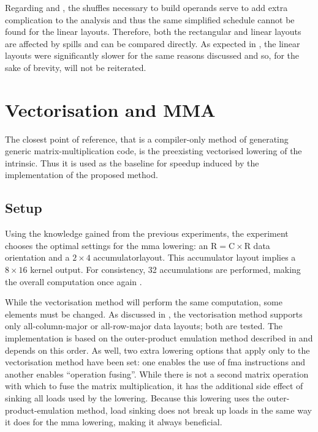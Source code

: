 \documentclass[\main/thesis.tex]{subfiles}
\begin{document}
Regarding  and , the shuffles necessary to build operands serve to add extra complication to the  analysis and thus the same simplified schedule cannot be found for the linear layouts.
Therefore, both the rectangular and linear layouts are affected by spills and can be compared directly.
As expected in , the linear layouts were significantly slower for the same reasons discussed and so, for the sake of brevity, will not be reiterated.

\section{Vectorisation and MMA}
The closest point of reference, that is a compiler-only method of generating generic matrix-multiplication code, is the preexisting vectorised lowering of the  intrinsic.
Thus it is used as the baseline for speedup induced by the implementation of the proposed method.

\subsection{Setup}
Using the knowledge gained from the previous experiments, the experiment chooses the optimal settings for the \gls{mma} lowering: an $\textrm{R} = \textrm{C} \times \textrm{R}$ data orientation and a $2 \times 4$ accumulator\footnotemark layout.
This accumulator layout implies a $8 \times 16$ kernel output.
For consistency, 32 accumulations are performed, making the overall computation once again .

While the vectorisation method will perform the same computation, some elements must be changed.
As discussed in , the vectorisation method supports only all-column-major or all-row-major data layouts; both are tested.
The implementation is based on the outer-product emulation method described in  and depends on this order.
As well, two extra \gls{lowering} options that apply only to the vectorisation method have been set: one enables the use of \gls{fma} instructions and another enables ``operation fusing''.
While there is not a second matrix operation with which to fuse the matrix multiplication, it has the additional side effect of sinking all loads used by the \gls{lowering}.
Because this \gls{lowering} uses the outer-product-emulation method, load sinking does not break up loads in the same way it does for the \gls{mma} \gls{lowering}, making it always beneficial.
\end{document}
